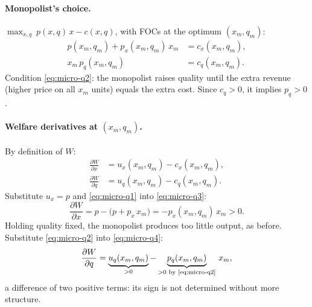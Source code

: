 \paragraph{Monopolist's choice.} $\max_{x,q}\ p(x,q)\,x-c(x,q)$, with FOCs at the optimum $(x_m,q_m)$:
\begin{align}
p(x_m,q_m)+p_x(x_m,q_m)\,x_m&=c_x(x_m,q_m), \label{eq:micro-q1}\\
x_m\,p_q(x_m,q_m)&=c_q(x_m,q_m). \label{eq:micro-q2}
\end{align}
Condition \eqref{eq:micro-q2}: the monopolist raises quality until the extra revenue (higher price on all $x_m$ units) equals the extra cost. Since $c_q>0$, it implies $p_q>0$.

\paragraph{Welfare derivatives at $(x_m,q_m)$.} By definition of $W$:
\begin{align}
\frac{\partial W}{\partial x}&=u_x(x_m,q_m)-c_x(x_m,q_m), \label{eq:micro-q3}\\
\frac{\partial W}{\partial q}&=u_q(x_m,q_m)-c_q(x_m,q_m). \label{eq:micro-q4}
\end{align}
Substitute $u_x=p$ and \eqref{eq:micro-q1} into \eqref{eq:micro-q3}:
\[
\frac{\partial W}{\partial x}=p-\big(p+p_x\,x_m\big)=-p_x(x_m,q_m)\,x_m>0 .
\]
Holding quality fixed, the monopolist produces too little output, as before. Substitute \eqref{eq:micro-q2} into \eqref{eq:micro-q4}:
\begin{equation}\label{eq:micro-q5}
\frac{\partial W}{\partial q}=\underbrace{u_q(x_m,q_m)}_{>0}-\underbrace{p_q(x_m,q_m)}_{>0\text{ by \eqref{eq:micro-q2}}}\,x_m ,
\end{equation}
a difference of two positive terms: its sign is not determined without more structure.

